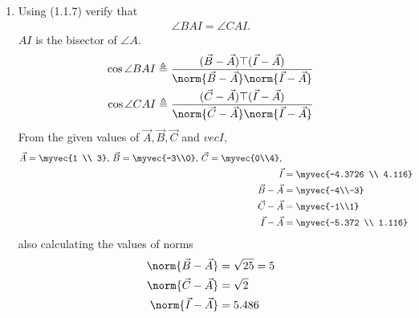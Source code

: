\documentclass[11pt]{book}
\begin{document}
\begin{enumerate}[label=\thesection.\arabic*.,ref=\thesection.\theenumi]
  
\item Using (1.1.7) verify that 
\begin{align}
\angle BAI = \angle CAI.
\end{align}
$AI$ is the bisector of $\angle A$. \\
\solution
\begin{align}
\label{eq:1.5.5.2}
\cos{\angle BAI} \triangleq \frac{(\vec{B}-\vec{A})\top(\vec{I}-\vec{A})}{\norm{\vec{B}-\vec{A}}\norm{\vec{I}-\vec{A}}} \\
\cos{\angle CAI} \triangleq \frac{(\vec{C}-\vec{A})\top(\vec{I}-\vec{A})}{\norm{\vec{C}-\vec{A}}\norm{\vec{I}-\vec{A}}} 
\end{align}
From the given values of $\vec{A},\vec{B},\vec{C}$ and $vec{I}$,\\
\begin{align}
    \vec{A}=\myvec{1 \\ 3},\,
\vec{B}=\myvec{-3\\0},\,
	\vec{C}=\myvec{0\\4},\, \\
 \vec{I} &= \myvec{-4.3726 \\ 4.116} \\
	\vec{B}-\vec{A} &=\myvec{-4\\-3} \\
	\vec{C}-\vec{A}&= \myvec{-1\\1} \\
 \vec{I}-\vec{A}  &=\myvec{-5.372 \\ 1.116}
\end{align}
also calculating the values of norms
\begin{align}
	\norm{\vec{B}-\vec{A}} &= \sqrt{25} = 5\\
	\norm{\vec{C}-\vec{A}} &= \sqrt{2} \\
 	\norm{\vec{I}-\vec{A}} &= 5.486 \\
\end{align}



\end{enumerate}
\end{document}
